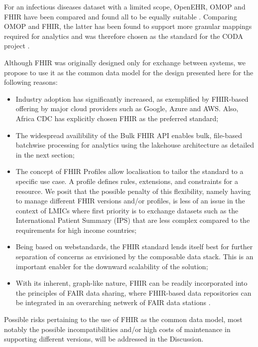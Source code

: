 \documentclass[
  authoryear]{elsarticle}
\providecommand{\tightlist}{%
  \setlength{\itemsep}{0pt}\setlength{\parskip}{0pt}}\usepackage{longtable,booktabs,array}
\begin{document}
For an infectious diseases dataset with a limited scope, OpenEHR, OMOP
and FHIR have been compared and found all to be equally suitable
\citep{rinaldi2021openehr}. Comparing OMOP and FHIR, the latter has been
found to support more granular mappings required for analytics and was
therefore chosen as the standard for the CODA project
\citep{mullie2023coda}.

Although FHIR was originally designed only for exchange between systems,
we propose to use it as the common data model for the design presented
here for the following reasons:

\begin{itemize}
\tightlist
\item
  Industry adoption has significantly increased, as exemplified by
  FHIR-based offering by major cloud providers such as Google, Azure and
  AWS. Also, Africa CDC has explicitly chosen FHIR as the preferred
  standard;
\item
  The widespread availibility of the Bulk FHIR API
  \citep{mandl2020push, jones2021landscape} enables bulk, file-based
  batchwise processing for analytics using the lakehouse architecture as
  detailed in the next section;
\item
  The concept of FHIR Profiles allow localisation to tailor the standard
  to a specific use case. A profile defines rules, extensions, and
  constraints for a resource. We posit that the possible penalty of this
  flexibility, namely having to manage different FHIR versions and/or
  profiles, is less of an issue in the context of LMICs where first
  priority is to exchange datasets such as the International Patient
  Summary (IPS) that are less complex compared to the requirements for
  high income countries;
\item
  Being based on webstandards, the FHIR standard lends itself best for
  further separation of concerns as envisioned by the composable data
  stack. This is an important enabler for the downward scalability of
  the solution;
\item
  With its inherent, graph-like nature, FHIR can be readily incorporated
  into the principles of FAIR data sharing, where FHIR-based data
  repositories can be integrated in an overarching netwerk of FAIR data
  stations \citep{sinaci2023data, pedrera-jimenez2023can}.
\end{itemize}

Possible risks pertaining to the use of FHIR as the common data model,
most notably the possible incompatibilities and/or high costs of
maintenance in supporting different versions, will be addressed in the
Discussion.
\end{document}
